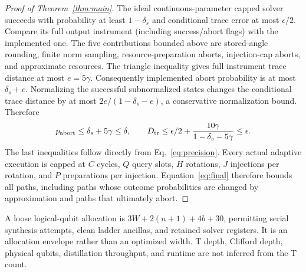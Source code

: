 \documentclass[11pt]{article}
\begin{document}
\begin{proof}[Proof of Theorem~\ref{thm:main}]
The ideal continuous-parameter capped solver succeeds with probability at least $1-\delta_s$ and conditional trace error at most $\epsilon/2$. Compare its full output instrument (including success/abort flags) with the implemented one. The five contributions bounded above are stored-angle rounding, finite norm sampling, resource-preparation aborts, injection-cap aborts, and approximate resources. The triangle inequality gives full instrument trace distance at most $e=5\gamma$. Consequently implemented abort probability is at most $\delta_s+e$. Normalizing the successful subnormalized states changes the conditional trace distance by at most $2e/(1-\delta_s-e)$, a conservative normalization bound. Therefore
\begin{equation}\label{eq:guarantee}
 p_{\rm abort}\le\delta_s+5\gamma\le\delta,\qquad
 D_{\rm tr}\le\epsilon/2+\frac{10\gamma}{1-\delta_s-5\gamma}\le\epsilon.
\end{equation}
The last inequalities follow directly from Eq.~\eqref{eq:precision}. Every actual adaptive execution is capped at $C$ cycles, $Q$ query slots, $H$ rotations, $J$ injections per rotation, and $P$ preparations per injection. Equation~\eqref{eq:final} therefore bounds all paths, including paths whose outcome probabilities are changed by approximation and paths that ultimately abort.
\end{proof}

A loose logical-qubit allocation is $3W+2(n+1)+4b+30$, permitting serial synthesis attempts, clean ladder ancillas, and retained solver registers. It is an allocation envelope rather than an optimized width. T depth, Clifford depth, physical qubits, distillation throughput, and runtime are not inferred from the T count.
\end{document}
